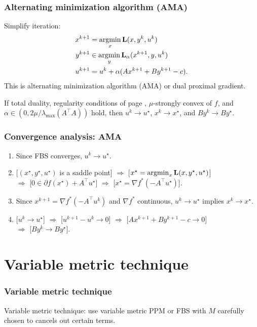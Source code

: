 \documentclass[10pt,mathserif]{beamer}
\begin{document}
\begin{frame}
\frametitle{Alternating minimization algorithm (AMA)}
Simplify iteration:
\begin{align*}
x^{k+1}&=\operatorname*{argmin}_x \mathbf{L}(x,y^k, u ^k)\\
y^{k+1}&\in\operatorname*{argmin}_y \mathbf{L}_\alpha (x^{k+1},y, u ^k)\\
 u ^{k+1}&= u ^k+\alpha(Ax^{k+1}+By^{k+1}-c).
\end{align*}
This is alternating minimization algorithm (AMA) or dual proximal gradient.

\vspace{0.2in}
If total duality, regularity conditions of page \pageref{frame_admm_first}, $\mu$-strongly convex of $f$, and $\alpha\in (0,2\mu/\lambda_{\mathrm{max}}(A^\intercal A))$ hold,
then $ u ^k\rightarrow  u ^\star$, $x^{k}\rightarrow x^\star$,
and $By^k\rightarrow By^\star$.
\end{frame}


\begin{frame}
\frametitle{Convergence analysis: AMA}
\begin{enumerate}
\item 
Since FBS converges, $ u ^k\rightarrow  u ^\star$.
\item 

[$(x^\star,y^\star, u ^\star)$ is a saddle point] $\Rightarrow$ 
[$x^\star=\operatorname*{argmin}_x\mathbf{L}(x,y^\star, u ^\star)$] \\$\Rightarrow$ 
[$0\in \partial f(x^\star)+A^\intercal u ^\star$] $\Rightarrow$ 
[$x^\star=\nabla f^*(-A^\intercal u ^\star)$].
\item
Since $x^{k+1}=\nabla f^*(-A^\intercal u ^k)$ and $\nabla f^*$ continuous, $ u ^k\rightarrow  u ^\star$ implies $x^k\rightarrow x^\star$.
\item

[$ u ^k\rightarrow  u ^\star$]  $\Rightarrow$ 
[$ u ^{k+1}- u ^k\rightarrow 0$] $\Rightarrow$ 
[$Ax^{k+1}+By^{k+1}-c\rightarrow 0$]\\ $\Rightarrow$ 
[$By^{k}\rightarrow By^{\star}$].
\end{enumerate}
\end{frame}



\section{Variable metric technique}
\begin{frame}
\frametitle{Variable metric technique}


Variable metric technique: use variable metric PPM or FBS with $M$ carefully chosen to cancels out certain terms.
\end{frame}
\end{document}
